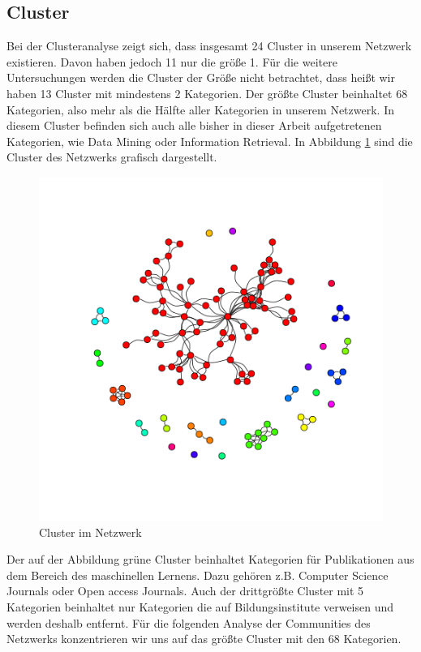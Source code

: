 \documentclass{acm_proc_article-sp}
\begin{document}
\subsection{Cluster}
Bei der Clusteranalyse zeigt sich, dass insgesamt 24 Cluster in unserem Netzwerk existieren. Davon haben jedoch 11 nur die größe 1. Für die weitere Untersuchungen werden die Cluster der Größe nicht betrachtet, dass heißt wir haben 13 Cluster mit mindestens 2 Kategorien.
Der größte Cluster beinhaltet 68 Kategorien, also mehr als die Hälfte aller Kategorien in unserem Netzwerk.
In diesem Cluster befinden sich auch alle bisher in dieser Arbeit aufgetretenen Kategorien, wie Data Mining oder Information Retrieval. In Abbildung \ref{fig:clusters} sind die Cluster des Netzwerks grafisch dargestellt.
\begin{figure}[H]
\centering
\includegraphics[scale=0.55]{../visualization/ml_cluster_graph.png}
\caption{Cluster im Netzwerk}
\label{fig:clusters}
\end{figure}
Der auf der Abbildung grüne Cluster beinhaltet Kategorien für Publikationen aus dem Bereich des maschinellen Lernens. Dazu gehören z.B. Computer Science Journals oder Open access Journals. Auch der drittgrößte Cluster mit 5 Kategorien beinhaltet nur Kategorien die auf Bildungsinstitute verweisen und werden deshalb entfernt. Für die folgenden Analyse der Communities des Netzwerks konzentrieren wir uns auf das größte Cluster mit den 68 Kategorien.
\end{document}
